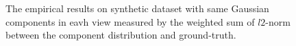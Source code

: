 \documentclass[11pt]{article}
\begin{document}
\begin{figure}
\caption{The empirical results on synthetic dataset with same Gaussian components in eavh view measured by the weighted sum of $l2$-norm between the component distribution and ground-truth.}
\end{figure}


\end{document}
